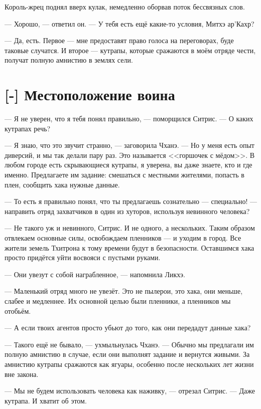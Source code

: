 Король-жрец поднял вверх кулак, немедленно оборвав поток бессвязных слов.

--- Хорошо, --- ответил он.
--- У тебя есть ещё какие-то условия, Митхэ ар'Кахр?

--- Да, есть.
Первое --- мне предоставят право голоса на переговорах, буде таковые случатся.
И второе --- кутрапы, которые сражаются в моём отряде чести, получат полную амнистию в землях сели.

\section{[-] Местоположение воина}

--- Я не уверен, что я тебя понял правильно, --- поморщился Ситрис.
--- О каких кутрапах речь?

--- Я знаю, что это звучит странно, --- заговорила Чханэ.
--- Но у меня есть опыт диверсий, и мы так делали пару раз.
Это называется <<горшочек с мёдом>>.
В любом городе есть скрывающиеся кутрапы, я уверена, вы даже знаете, кто и где именно.
Предлагаете им задание: смешаться с местными жителями, попасть в плен, сообщить хака нужные данные.

--- То есть я правильно понял, что ты предлагаешь сознательно --- специально! --- направить отряд захватчиков в один из хуторов, используя невинного человека?

--- Не такого уж и невинного, Ситрис.
И не одного, а нескольких.
Таким образом отвлекаем основные силы, освобождаем пленников --- и уходим в город.
Все жители земель Тхитрона к тому времени будут в безопасности.
Оставшимся хака просто придётся уйти восвояси с пустыми руками.

--- Они увезут с собой награбленное, --- напомнила Ликхэ.

--- Маленький отряд много не увезёт.
Это не пылерои, это хака, они меньше, слабее и медленнее.
Их основной целью были пленники, а пленников мы отобьём.

--- А если твоих агентов просто убьют до того, как они передадут данные хака?

--- Такого ещё не бывало, --- ухмыльнулась Чханэ.
--- Обычно мы предлагали им полную амнистию в случае, если они выполнят задание и вернутся живыми.
За амнистию кутрапы сражаются как ягуары, особенно после нескольких лет жизни вне закона.

--- Мы не будем использовать человека как наживку, --- отрезал Ситрис.
--- Даже кутрапа.
И хватит об этом.

\textspace

